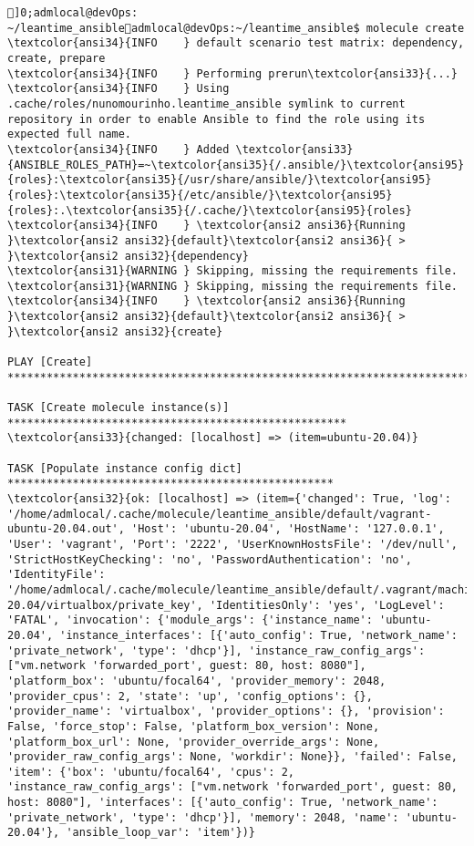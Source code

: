 \documentclass{scrartcl}
\title{}
\begin{document}
\begin{Verbatim}
]0;admlocal@devOps: ~/leantime_ansibleadmlocal@devOps:~/leantime_ansible$ molecule create
\textcolor{ansi34}{INFO    } default scenario test matrix: dependency, create, prepare
\textcolor{ansi34}{INFO    } Performing prerun\textcolor{ansi33}{...}
\textcolor{ansi34}{INFO    } Using .cache/roles/nunomourinho.leantime_ansible symlink to current repository in order to enable Ansible to find the role using its expected full name.
\textcolor{ansi34}{INFO    } Added \textcolor{ansi33}{ANSIBLE_ROLES_PATH}=~\textcolor{ansi35}{/.ansible/}\textcolor{ansi95}{roles}:\textcolor{ansi35}{/usr/share/ansible/}\textcolor{ansi95}{roles}:\textcolor{ansi35}{/etc/ansible/}\textcolor{ansi95}{roles}:.\textcolor{ansi35}{/.cache/}\textcolor{ansi95}{roles}
\textcolor{ansi34}{INFO    } \textcolor{ansi2 ansi36}{Running }\textcolor{ansi2 ansi32}{default}\textcolor{ansi2 ansi36}{ > }\textcolor{ansi2 ansi32}{dependency}
\textcolor{ansi31}{WARNING } Skipping, missing the requirements file.
\textcolor{ansi31}{WARNING } Skipping, missing the requirements file.
\textcolor{ansi34}{INFO    } \textcolor{ansi2 ansi36}{Running }\textcolor{ansi2 ansi32}{default}\textcolor{ansi2 ansi36}{ > }\textcolor{ansi2 ansi32}{create}

PLAY [Create] *************************************************************************

TASK [Create molecule instance(s)] ****************************************************
\textcolor{ansi33}{changed: [localhost] => (item=ubuntu-20.04)}

TASK [Populate instance config dict] **************************************************
\textcolor{ansi32}{ok: [localhost] => (item={'changed': True, 'log': '/home/admlocal/.cache/molecule/leantime_ansible/default/vagrant-ubuntu-20.04.out', 'Host': 'ubuntu-20.04', 'HostName': '127.0.0.1', 'User': 'vagrant', 'Port': '2222', 'UserKnownHostsFile': '/dev/null', 'StrictHostKeyChecking': 'no', 'PasswordAuthentication': 'no', 'IdentityFile': '/home/admlocal/.cache/molecule/leantime_ansible/default/.vagrant/machines/ubuntu-20.04/virtualbox/private_key', 'IdentitiesOnly': 'yes', 'LogLevel': 'FATAL', 'invocation': {'module_args': {'instance_name': 'ubuntu-20.04', 'instance_interfaces': [{'auto_config': True, 'network_name': 'private_network', 'type': 'dhcp'}], 'instance_raw_config_args': ["vm.network 'forwarded_port', guest: 80, host: 8080"], 'platform_box': 'ubuntu/focal64', 'provider_memory': 2048, 'provider_cpus': 2, 'state': 'up', 'config_options': {}, 'provider_name': 'virtualbox', 'provider_options': {}, 'provision': False, 'force_stop': False, 'platform_box_version': None, 'platform_box_url': None, 'provider_override_args': None, 'provider_raw_config_args': None, 'workdir': None}}, 'failed': False, 'item': {'box': 'ubuntu/focal64', 'cpus': 2, 'instance_raw_config_args': ["vm.network 'forwarded_port', guest: 80, host: 8080"], 'interfaces': [{'auto_config': True, 'network_name': 'private_network', 'type': 'dhcp'}], 'memory': 2048, 'name': 'ubuntu-20.04'}, 'ansible_loop_var': 'item'})}


\end{Verbatim}
\end{document}
